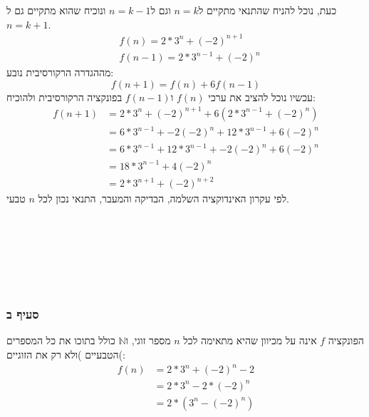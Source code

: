 \documentclass[11pt, oneside]{article}
\newcommand{\qed}{\R{$\blacksquare$}}
\newcommand{\br}{\\\\\\\\\\\\\\}
\newcommand{\mN}{\mathbb{N}}
\begin{document}
כעת, נוכל להניח שהתנאי מתקיים ל$n = k$ וגם ל$n = k - 1$ ונוכיח שהוא מתקיים גם ל$n = k + 1$.
\begin{align*}
& f(n) = 2 * 3^n + (−2)^{n+1}\\
& f(n-1) = 2 * 3^{n-1} + (-2)^n
\end{align*}
מההגדרה הרקורסיבית נובע:
$$f(n + 1) = f(n) + 6f(n-1)$$
עכשיו נוכל להציב את ערכי $f(n)$ ו$f(n-1)$ בפונקציה הרקורסיבית ולהוכיח:
\begin{align*}
f(n+1) & = 2 * 3^n + (−2)^{n+1} + 6(2 * 3^{n-1} + (-2)^n)\\
& = 6 * 3^{n-1} + -2(-2)^n + 12 * 3^{n-1} + 6(-2)^n\\
& = 6 * 3^{n-1} + 12 * 3^{n-1} + -2(-2)^n + 6(-2)^n\\
& = 18 * 3^{n-1} + 4(-2)^n\\
& = 2 * 3^{n+1} + (-2)^{n+2}
\end{align*}
לפי עקרון האינדוקציה השלמה, הבדיקה והמעבר, התנאי נכון לכל $n$ טבעי.
\br\qed

\subsubsection{סעיף ב}
הפונקציה $f$ אינה על מכיוון שהיא מתאימה לכל $n$ מספר זוגי, ו$\mN$ כולל בתוכו את כל המספרים הטבעיים )ולא רק את הזוגיים(:
\begin{align*}
f(n) & = 2 * 3^n + (-2)^n -2\\
& = 2 * 3^n - 2 * (-2)^n\\
& = 2 * (3^n - (-2)^n)
\end{align*}
\qed
\end{document}
